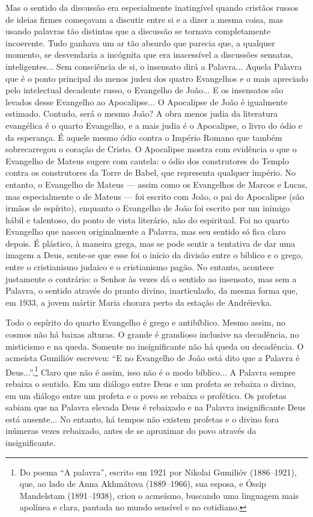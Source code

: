 Mas o sentido da discussão era especialmente inatingível quando cristãos
russos de ideias firmes começavam a discutir entre si e a dizer a mesma
coisa, mas usando palavras tão distintas que a discussão se tornava
completamente incoerente. Tudo ganhava um ar tão absurdo que parecia
que, a qualquer momento, se desvendaria a incógnita que era inacessível
a discussões sensatas, inteligentes... Sem consciência de si, o
insensato dirá a Palavra... Aquela Palavra que é o ponto principal do
menos judeu dos quatro Evangelhos e o mais apreciado pelo intelectual
decadente russo, o Evangelho de João... E os insensatos são levados
desse Evangelho ao Apocalipse... O Apocalipse de João é igualmente
estimado. Contudo, será o mesmo João? A obra menos judia da literatura
evangélica é o quarto Evangelho, e a mais judia é o Apocalipse, o livro
do ódio e da esperança. É aquele mesmo ódio contra o Império Romano que
também sobrecarregou o coração de Cristo. O Apocalipse mostra com
evidência o que o Evangelho de Mateus sugere com cautela: o ódio dos
construtores do Templo contra os construtores da Torre de Babel, que
representa qualquer império. No entanto, o Evangelho de Mateus --- assim
como os Evangelhos de Marcos e Lucas, mas especialmente o de Mateus ---
foi escrito com João, o pai do Apocalipse (são irmãos de espírito),
enquanto o Evangelho de João foi escrito por um inimigo hábil e
talentoso, do ponto de vista literário, não do espiritual. Foi no quarto
Evangelho que nasceu originalmente a Palavra, mas seu sentido só fica
claro depois. É plástico, à maneira grega, mas se pode sentir a
tentativa de dar uma imagem a Deus, sente-se que esse foi o início da
divisão entre o bíblico e o grego, entre o cristianismo judaico e o
cristianismo pagão. No entanto, acontece justamente o contrário: o
Senhor às vezes dá o sentido ao insensato, mas sem a Palavra, o sentido
através do pranto divino, inarticulado, da mesma forma que, em 1933, a
jovem mártir Maria chorara perto da estação de Andréievka.

Todo o espírito do quarto Evangelho é grego e antibíblico. Mesmo assim,
no cosmos não há baixas alturas. O grande é grandioso inclusive na
decadência, no misticismo e na queda. Somente no insignificante não há
queda ou decadência. O acmeísta Gumilióv escreveu: ``E no Evangelho de
João está dito que a Palavra é Deus...''.\footnote{Do poema ``A
  palavra'', escrito em 1921 por Nikolai Gumilióv (1886\emph{--}1921),
  que, ao lado de Anna Akhmátova (1889\emph{--}1966), sua esposa, e
  Óssip Mandelstam (1891\emph{--}1938), criou o acmeísmo, buscando uma
  linguagem mais apolínea e clara, pautada no mundo sensível e no
  cotidiano.} Claro que não é assim, isso não é o modo bíblico... A
Palavra sempre rebaixa o sentido. Em um diálogo entre Deus e um profeta
se rebaixa o divino, em um diálogo entre um profeta e o povo se rebaixa
o profético. Os profetas sabiam que na Palavra elevada Deus é rebaixado
e na Palavra insignificante Deus está ausente... No entanto, há tempos
não existem profetas e o divino fora inúmeras vezes rebaixado, antes de
se aproximar do povo através da insignificante.

